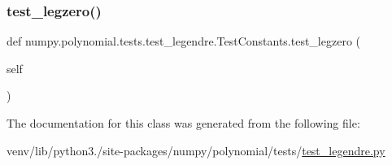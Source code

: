 \subsubsection{\texorpdfstring{test\+\_\+legzero()}{test\_legzero()}}
{\footnotesize\ttfamily def numpy.\+polynomial.\+tests.\+test\+\_\+legendre.\+Test\+Constants.\+test\+\_\+legzero (\begin{DoxyParamCaption}\item[{}]{self }\end{DoxyParamCaption})}



The documentation for this class was generated from the following file\+:\begin{DoxyCompactItemize}
\item 
venv/lib/python3./site-\/packages/numpy/polynomial/tests/\hyperlink{test__legendre_8py}{test\+\_\+legendre.\+py}\end{DoxyCompactItemize}
